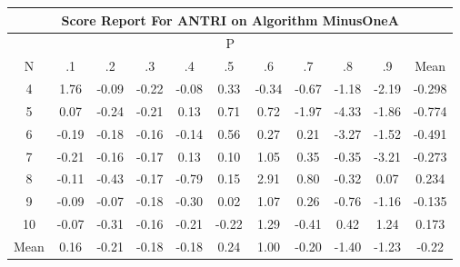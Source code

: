 \documentclass[11pt,a4paper]{report}
\begin{document}
\begin{longtable}{ | c || c | c | c | c | c | c | c | c | c || c |}
\hline
\multicolumn{11}{|c|}{ Score Report For ANTRI on Algorithm MinusOneA} \\
\hline
\multicolumn{11}{|c|}{ P } \\
\hline
N & .1 & .2 & .3 & .4 & .5 & .6 & .7 & .8 & .9 & Mean\\
 \hline
 \hline
 \endhead
  4 &  \cellcolor[HTML]{CFCFFF} 1.76 &  \cellcolor[HTML]{FFFFFF} -0.09 &  \cellcolor[HTML]{FFF7F7} -0.22 &  \cellcolor[HTML]{FFFFFF} -0.08 &  \cellcolor[HTML]{F7F7FF} 0.33 &  \cellcolor[HTML]{FFF7F7} -0.34 &  \cellcolor[HTML]{FFEFEF} -0.67 &  \cellcolor[HTML]{FFDFDF} -1.18 &  \cellcolor[HTML]{FFC7C7} -2.19 & -0.298 \\
  5 &  \cellcolor[HTML]{FFFFFF} 0.07 &  \cellcolor[HTML]{FFF7F7} -0.24 &  \cellcolor[HTML]{FFF7F7} -0.21 &  \cellcolor[HTML]{FFFFFF} 0.13 &  \cellcolor[HTML]{EFEFFF} 0.71 &  \cellcolor[HTML]{EFEFFF} 0.72 &  \cellcolor[HTML]{FFCFCF} -1.97 &  \cellcolor[HTML]{FF8F8F} -4.33 &  \cellcolor[HTML]{FFCFCF} -1.86 & -0.774 \\
  6 &  \cellcolor[HTML]{FFF7F7} -0.19 &  \cellcolor[HTML]{FFF7F7} -0.18 &  \cellcolor[HTML]{FFF7F7} -0.16 &  \cellcolor[HTML]{FFFFFF} -0.14 &  \cellcolor[HTML]{EFEFFF} 0.56 &  \cellcolor[HTML]{F7F7FF} 0.27 &  \cellcolor[HTML]{F7F7FF} 0.21 &  \cellcolor[HTML]{FFAFAF} -3.27 &  \cellcolor[HTML]{FFD7D7} -1.52 & -0.491 \\
  7 &  \cellcolor[HTML]{FFF7F7} -0.21 &  \cellcolor[HTML]{FFFFFF} -0.16 &  \cellcolor[HTML]{FFF7F7} -0.17 &  \cellcolor[HTML]{FFFFFF} 0.13 &  \cellcolor[HTML]{FFFFFF} 0.10 &  \cellcolor[HTML]{E7E7FF} 1.05 &  \cellcolor[HTML]{F7F7FF} 0.35 &  \cellcolor[HTML]{FFF7F7} -0.35 &  \cellcolor[HTML]{FFAFAF} -3.21 & -0.273 \\
  8 &  \cellcolor[HTML]{FFFFFF} -0.11 &  \cellcolor[HTML]{FFF7F7} -0.43 &  \cellcolor[HTML]{FFF7F7} -0.17 &  \cellcolor[HTML]{FFEFEF} -0.79 &  \cellcolor[HTML]{FFFFFF} 0.15 &  \cellcolor[HTML]{B7B7FF} 2.91 &  \cellcolor[HTML]{E7E7FF} 0.80 &  \cellcolor[HTML]{FFF7F7} -0.32 &  \cellcolor[HTML]{FFFFFF} 0.07 & 0.234 \\
  9 &  \cellcolor[HTML]{FFFFFF} -0.09 &  \cellcolor[HTML]{FFFFFF} -0.07 &  \cellcolor[HTML]{FFF7F7} -0.18 &  \cellcolor[HTML]{FFF7F7} -0.30 &  \cellcolor[HTML]{FFFFFF} 0.02 &  \cellcolor[HTML]{E7E7FF} 1.07 &  \cellcolor[HTML]{F7F7FF} 0.26 &  \cellcolor[HTML]{FFEFEF} -0.76 &  \cellcolor[HTML]{FFDFDF} -1.16 & -0.135 \\
  10 &  \cellcolor[HTML]{FFFFFF} -0.07 &  \cellcolor[HTML]{FFF7F7} -0.31 &  \cellcolor[HTML]{FFF7F7} -0.16 &  \cellcolor[HTML]{FFF7F7} -0.21 &  \cellcolor[HTML]{FFF7F7} -0.22 &  \cellcolor[HTML]{DFDFFF} 1.29 &  \cellcolor[HTML]{FFF7F7} -0.41 &  \cellcolor[HTML]{F7F7FF} 0.42 &  \cellcolor[HTML]{DFDFFF} 1.24 & 0.173 \\
 \hline
 \hline
Mean &  \cellcolor[HTML]{F7F7FF} 0.16 &  \cellcolor[HTML]{FFF7F7} -0.21 &  \cellcolor[HTML]{FFF7F7} -0.18 &  \cellcolor[HTML]{FFF7F7} -0.18 &  \cellcolor[HTML]{F7F7FF} 0.24 &  \cellcolor[HTML]{E7E7FF} 1.00 &  \cellcolor[HTML]{FFF7F7} -0.20 &  \cellcolor[HTML]{FFDFDF} -1.40 &  \cellcolor[HTML]{FFDFDF} -1.23 &  \cellcolor[HTML]{FFF7F7} -0.22
\end{longtable}
\end{document}
